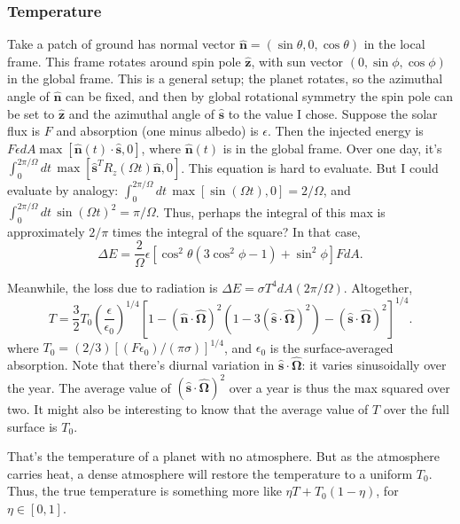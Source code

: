 \documentclass[11pt,twocolumn]{article}
\newcommand{\unit}[1]{\hat{\bm {#1}}}
\newcommand{\parens}[1]{\left(#1\right)}
\newcommand{\brackets}[1]{\left[#1\right]}
\begin{document}
    \subsubsection{Temperature}
      Take a patch of ground has normal vector $\unit n = (\sin \theta, 0, \cos \theta)$ in the local frame. This frame rotates around spin pole $\unit z$, with sun vector $(0, \sin \phi, \cos \phi)$ in the global frame. This is a general setup; the planet rotates, so the azimuthal angle of $\unit n$ can be fixed, and then by global rotational symmetry the spin pole can be set to $\unit z$ and the azimuthal angle of $\unit s$ to the value I chose. Suppose the solar flux is $F$ and absorption (one minus albedo) is $\epsilon$. Then the injected energy is $F \epsilon dA \max[\unit n(t) \cdot \unit s, 0]$, where $\unit n(t)$ is in the global frame. Over one day, it's $\int_0^{2\pi/\Omega} dt\, \max[\unit s^T R_z(\Omega t) \unit n,0]$. This equation is hard to evaluate. But I could evaluate by analogy: $\int_0^{2\pi/\Omega} dt\, \max[\sin (\Omega t),0] = 2/\Omega$, and $\int_0^{2\pi/\Omega} dt\, \sin (\Omega t)^2 = \pi/\Omega$. Thus, perhaps the integral of this max is approximately $2/\pi$ times the integral of the square? In that case,
      \begin{equation}
        \Delta E = \frac{2}{\Omega}\epsilon \brackets{\cos^2 \theta (3\cos^2 \phi - 1) + \sin^2 \phi}F dA.
      \end{equation}

      Meanwhile, the loss due to radiation is $\Delta E = \sigma T^4 dA (2\pi / \Omega)$. Altogether,
      \begin{equation}
        T = \frac{3}{2}T_0\parens{\frac{\epsilon}{\epsilon_0}}^{1/4} \brackets{1 - (\unit n \cdot \unit \Omega)^2 (1 - 3(\unit s \cdot \unit \Omega)^2) - (\unit s \cdot \unit \Omega)^2}^{1/4}.
      \end{equation}
      where $T_0 = (2/3)[(F\epsilon_0) / (\pi\sigma)]^{1/4}$, and $\epsilon_0$ is the surface-averaged absorption. Note that there's diurnal variation in $\unit s \cdot \unit \Omega$: it varies sinusoidally over the year. The average value of $(\unit s \cdot \unit \Omega)^2$ over a year is thus the max squared over two. It might also be interesting to know that the average value of $T$ over the full surface is $T_0$.

      That's the temperature of a planet with no atmosphere. But as the atmosphere carries heat, a dense atmosphere will restore the temperature to a uniform $T_0$. Thus, the true temperature is something more like $\eta T + T_0 (1 - \eta)$, for $\eta \in [0,1]$.
      
\end{document}
